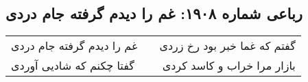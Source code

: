 \begin{center}
\section*{رباعی شماره ۱۹۰۸: غم را دیدم گرفته جام دردی}
\label{sec:1908}
\begin{longtable}{l p{0.5cm} r}
غم را دیدم گرفته جام دردی
&&
گفتم که غما خبر بود رخ زردی
\\
گفتا چکنم که شادیی آوردی
&&
بازار مرا خراب و کاسد کردی
\\
\end{longtable}
\end{center}
